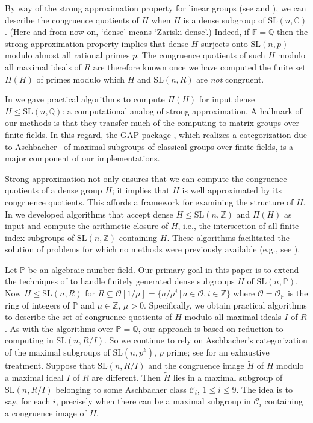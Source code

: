 \documentclass[11pt]{amsart}
\theoremstyle{definition}
\theoremstyle{remark}
\newcommand{\F}{\mathbb{F}}
\newcommand{\Z}{\mathbb{Z}}
\newcommand{\Q}{\mathbb{Q}}
\renewcommand{\P}{\mathbb{P}}
\newcommand{\C}{\mathbb{C}}
\newcommand{\SL}{\mathrm{SL}}
\newcommand{\calc}{\mathscr{C}}
\begin{document}
 By way of the strong approximation property for linear groups 
(see \cite[Window~9]{LubotzkySegal} and \cite{RapinchukSAT,Weis}),
 we can describe the congruence quotients of
$H$ when $H$ is a dense subgroup of $\SL(n,\C)$.
(Here and from now on, `dense' means `Zariski dense'.)
Indeed, if $\F = \Q$ then the strong approximation
property implies that dense $H$ surjects onto $\SL(n,p)$
modulo almost all rational primes $p$. The congruence 
quotients of such $H$ modulo all maximal ideals of $R$ are 
therefore known once we have computed the finite set $\Pi(H)$ 
of primes modulo which $H$ and $\SL(n, R)$ are \emph{not} congruent. 

In \cite{ExpMath,SAT} we gave practical algorithms 
to compute $\Pi(H)$ for input dense $H \leq \SL(n, \Q)$:
a computational analog of strong approximation.
A hallmark of our methods is that they transfer 
much of the computing to matrix groups 
over finite fields. In this regard, the {\sf GAP} package 
\cite{NSrecog}, which realizes a categorization due to 
Aschbacher~\cite{Aschbacher84} of maximal subgroups of classical 
groups over finite fields, is a major component of our 
implementations.

Strong approximation not only ensures that
we can compute the congruence quotients of a dense group $H$; 
it implies that $H$ is well approximated by its congruence 
quotients. This affords a framework for examining the structure
of $H$. In \cite{Density} we developed algorithms that accept
 dense $H\leq \SL(n,\Z)$ and $\Pi(H)$ as input and compute the 
arithmetic closure of $H$, i.e., the intersection of all 
finite-index subgroups of $\SL(n, \Z)$ containing $H$. These 
algorithms facilitated the solution of problems for which no 
methods were previously available (e.g., 
see \cite[Section~4]{Density}).

Let $\P$ be an algebraic number field. Our primary goal in this 
paper is to extend the techniques of \cite{ExpMath,SAT} to handle 
finitely generated dense subgroups $H$ of $\SL(n, \P)$. 
Now $H\leq \SL(n,R)$ for $R\subseteq \mathcal{O}[1/\mu]=
\{ a/\mu^i \, | \, a \in \mathcal{O}, i \in \Z\}$ where 
$\mathcal{O} = \mathcal{O}_{\P}$ is the ring of integers of $\P$ 
and $\mu\in \Z$, $\mu >0$. Specifically, we obtain practical 
algorithms to describe the set of congruence quotients of $H$
modulo all maximal ideals $I$ of $R$. As with the algorithms over 
$\P=\Q$, our approach is based on reduction to computing in 
$\SL(n,R/I)$. So we continue to rely on Aschbacher's categorization 
of the maximal subgroups of $\SL(n, p^k)$, $p$ prime; see 
\cite{Brayetal} for an exhaustive treatment. Suppose that $\SL(n,R/I)$ 
and the congruence image $\widetilde{H}$ of $H$ modulo a maximal ideal 
$I$ of $R$ are different. Then $\widetilde{H}$ lies in a maximal 
subgroup of $\SL(n,R/I)$ belonging to some Aschbacher class $\calc_i$, 
$1 \leq i \leq 9$. The idea is to say, for each $i$, precisely when 
there can be a maximal subgroup in $\calc_i$ containing a congruence 
image of $H$.
\end{document}
